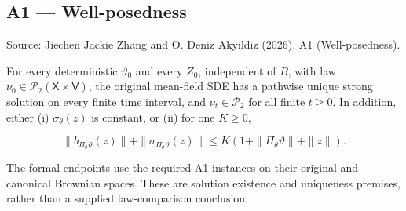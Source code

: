 \documentclass[11pt,a4paper]{report}
\begin{document}
\subsection{\texorpdfstring{A1 — Well-posedness}{A1 — Well-posedness}}


Source: Jiechen Jackie Zhang and O. Deniz Akyildiz (2026), A1 (Well-posedness).




For every deterministic \(\vartheta_0\) and every \(Z_0\), independent of \(B\), with law \(\nu_0\in\mathcal P_2(\mathsf X\times\mathsf V)\), the original mean-field SDE has a pathwise unique strong solution on every finite time interval, and \(\nu_t\in\mathcal P_2\) for all finite \(t\ge0\). In addition, either (i) \(\sigma_\theta(z)\) is constant, or (ii) for one \(K\ge0\),





\[\|b_{\Pi_\theta\vartheta}(z)\|+\|\sigma_{\Pi_\theta\vartheta}(z)\|\le K(1+\|\Pi_\theta\vartheta\|+\|z\|).\]





The formal endpoints use the required A1 instances on their original and canonical Brownian spaces. These are solution existence and uniqueness premises, rather than a supplied law-comparison conclusion.
\end{document}
